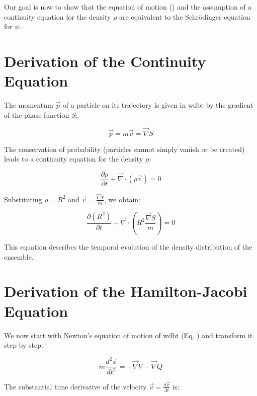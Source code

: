 Our goal is now to show that the equation of motion () and the assumption of a continuity equation for the density $\rho$ are equivalent to the Schrödinger equation for $\psi$.

\section{Derivation of the Continuity Equation}
\label{sec:kontinuitätsgleichung}
The momentum $\vec{p}$ of a particle on its trajectory is given in \gls{wdbt} by the gradient of the phase function $S$:

\begin{equation}
    \label{eq:impuls}
    \vec{p} = m \vec{v} = \vec{\nabla} S
\end{equation}

The conservation of probability (particles cannot simply vanish or be created) leads to a continuity equation for the density $\rho$:

\begin{equation}
    \frac{\partial \rho}{\partial t} + \vec{\nabla} \cdot (\rho \vec{v}) = 0
\end{equation}

Substituting $\rho = R^2$ and $\vec{v} = \frac{\vec{\nabla} S}{m}$, we obtain:

\begin{equation}
    \label{eq:kontinuitätsgleichung}
    \frac{\partial (R^2)}{\partial t} + \vec{\nabla} \cdot \left( R^2 \frac{\vec{\nabla} S}{m} \right) = 0
\end{equation}

This equation describes the temporal evolution of the density distribution of the ensemble.

\section{Derivation of the Hamilton-Jacobi Equation}
\label{sec:hamilton_jakobi_gleichung}
We now start with Newton's equation of motion of \gls{wdbt} (Eq. ) and transform it step by step.

\begin{equation}
    m \frac{d^2\vec{x}}{dt^2} = -\vec{\nabla} V - \vec{\nabla} Q \tag{3.1}
\end{equation}

The substantial time derivative of the velocity $\vec{v} = \frac{d \vec{x}}{dt}$ is:

